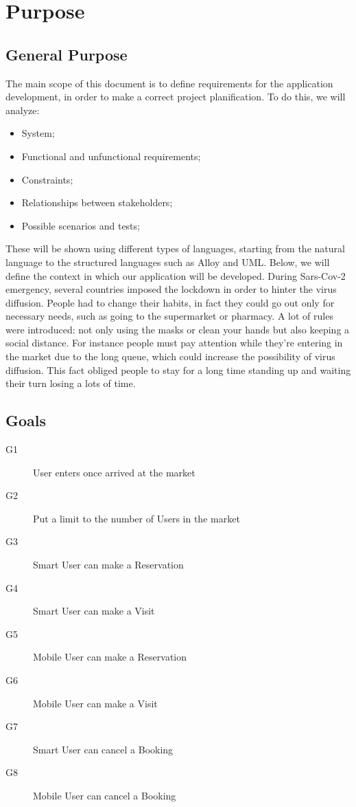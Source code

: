 \section{Purpose}
\subsection{General Purpose}

The main scope of this document is to define requirements for the application development, in order to make a correct project planification. 
To do this, we will analyze:

\begin{itemize}
\item System;
\item Functional and unfunctional requirements;
\item Constraints;
\item Relationships between stakeholders;
\item Possible scenarios and tests;
\end{itemize}
\medskip
These will be shown using different types of languages, starting from the natural language to the structured languages such as Alloy and UML.
Below, we will define the context in which our application will be developed.
During Sars-Cov-2 emergency, several countries imposed the lockdown in order to hinter the virus diffusion.
People had to change their habits, in fact they could go out only for necessary needs, such as going to the supermarket or pharmacy.
A lot of rules were introduced: not only using the masks or clean your hands but also keeping a social distance.
For instance people must pay attention while they're entering in the market due to the long queue, which could increase the possibility of virus diffusion.
This fact obliged people to stay for a long time standing up and waiting their turn losing a lots of time. 




\subsection{Goals}
\begin{description}
    \item[G1]User enters once arrived at the market
    \item[G2]Put a limit to the number of Users in the market
    \item[G3]Smart User can make a Reservation
    \item[G4]Smart User can make a Visit
    \item[G5]Mobile User can make a Reservation
    \item[G6]Mobile User can make a Visit
    \item[G7]Smart User can cancel a Booking
    \item[G8]Mobile User can cancel a Booking
\end{description}

